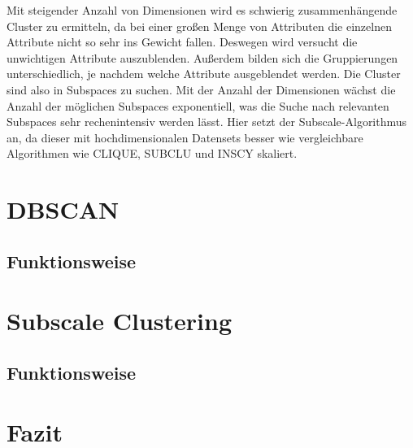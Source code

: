 \documentclass[utf8,biblatex]{lni}
\begin{document}
Mit steigender Anzahl von Dimensionen wird es schwierig
zusammenhängende Cluster zu ermitteln,
da bei einer großen Menge von Attributen die einzelnen
Attribute nicht so sehr ins Gewicht fallen.
Deswegen wird versucht die unwichtigen Attribute auszublenden.
Außerdem bilden sich die Gruppierungen unterschiedlich,
je nachdem welche Attribute ausgeblendet werden.
Die Cluster sind also in Subspaces zu suchen.
Mit der Anzahl der Dimensionen wächst die Anzahl der
möglichen Subspaces exponentiell, was die
Suche nach relevanten Subspaces sehr rechenintensiv
werden lässt. Hier setzt der Subscale-Algorithmus an,
da dieser mit hochdimensionalen Datensets besser wie
vergleichbare Algorithmen wie CLIQUE, SUBCLU und INSCY
skaliert.

\section{DBSCAN}

\subsection{Funktionsweise}
\section{Subscale Clustering}
\subsection{Funktionsweise}
\section{Fazit}



\printbibliography
\end{document}
